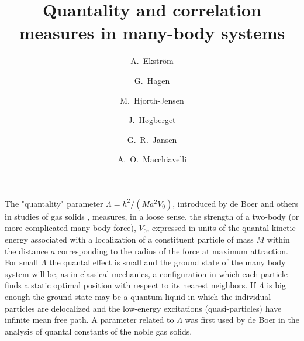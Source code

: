\documentclass[prl,twocolumn,superscriptaddress,showpacs,floatfix]{revtex4}
\begin{document}
\title{Quantality and correlation measures in many-body systems}
\author{A.~Ekstr\"om}
\author{G.~Hagen}
\author{M.~Hjorth-Jensen}
\author{J.~H\o gberget}
\author{G.~R.~Jansen}
\author{A.~O.~Macchiavelli}
 

\begin{abstract}
\end{abstract}


\maketitle 

The "quantality" parameter $\Lambda = h^2/(Ma^2V_0)$,
introduced by de Boer and others in studies of gas solids
\cite{mottelson1999}, measures, in a loose sense, the strength of a
two-body (or more complicated many-body force), $V_0$, expressed in
units of the quantal kinetic energy associated with a localization of
a constituent particle of mass $M$ within the distance $a$
corresponding to the radius of the force at maximum attraction. For
small $\Lambda$ the quantal effect is small and the ground state of
the many body system will be, as in classical mechanics, a
configuration in which each particle finds a static optimal position
with respect to its nearest neighbors. If $\Lambda$ is big enough the
ground state may be a quantum liquid in which the individual particles
are delocalized and the low-energy excitations (quasi-particles) have
infinite mean free path.  A parameter related to $\Lambda$ was first
used by de Boer in the analysis of quantal constants of the noble gas
solids.
\end{document}
